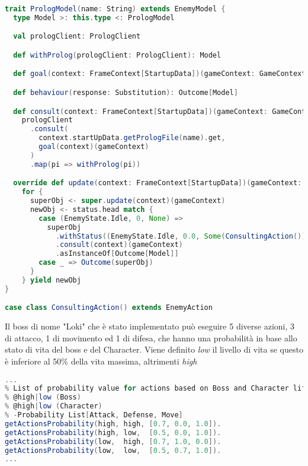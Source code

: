 \begin{lstlisting}[language=Scala]
trait PrologModel(name: String) extends EnemyModel {
  type Model >: this.type <: PrologModel

  val prologClient: PrologClient

  def withProlog(prologClient: PrologClient): Model

  def goal(context: FrameContext[StartupData])(gameContext: GameContext): String

  def behaviour(response: Substitution): Outcome[Model]

  def consult(context: FrameContext[StartupData])(gameContext: GameContext): Outcome[Model] =
    prologClient
      .consult(
        context.startUpData.getPrologFile(name).get,
        goal(context)(gameContext)
      )
      .map(pi => withProlog(pi))

  override def update(context: FrameContext[StartupData])(gameContext: GameContext): Outcome[Model] =
    for {
      superObj <- super.update(context)(gameContext)
      newObj <- status.head match {
        case (EnemyState.Idle, 0, None) =>
          superObj
            .withStatus((EnemyState.Idle, 0.0, Some(ConsultingAction())))
            .consult(context)(gameContext)
            .asInstanceOf[Outcome[Model]]
        case _ => Outcome(superObj)
      }
    } yield newObj
}

case class ConsultingAction() extends EnemyAction
\end{lstlisting}

Il boss di nome "Loki" che è stato implementato può eseguire 5 diverse azioni, 3 di attacco, 1 di movimento ed 1 di difesa,
che hanno una probabilità in base allo stato di vita del boss e del Character. 
Viene definito \textit{low} il livello di vita se questo è inferiore al 50\% della vita massima, altrimenti \textit{high}

\begin{lstlisting}[language=Scala]
% estratto del file prolog "assets/prolog/loki.pl"
... 
% List of probability value for actions based on Boss and Character life level
% @high|low (Boss)
% @high|low (Character)
% -Probability List[Attack, Defense, Move]
getActionsProbability(high, high, [0.7, 0.0, 1.0]).
getActionsProbability(high, low,  [0.5, 0.0, 1.0]).
getActionsProbability(low,  high, [0.7, 1.0, 0.0]).
getActionsProbability(low,  low,  [0.5, 0.7, 1.0]).
...
\end{lstlisting}

